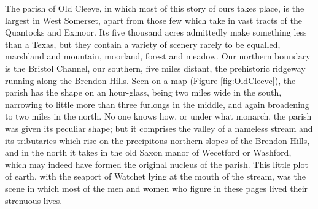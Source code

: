 
The parish of Old Cleeve, in which most of this story of ours takes place, is the largest in West Somerset, apart from those few which take in vast tracts of the Quantocks and Exmoor. Its five thousand acres admittedly make something less than a Texas, but they contain a variety of scenery rarely to be equalled, marshland and mountain, moorland, forest and meadow. Our northern boundary is the Bristol Channel, our southern, five miles distant, the prehistoric ridgeway running along the Brendon Hills. Seen on a map (Figure \ref{fig:OldCleeve}), the parish has the shape on an hour-glass, being two miles wide in the south, narrowing to little more than three furlongs in the middle, and again broadening to two miles in the north. No one knows how, or under what monarch, the parish was given its peculiar shape; but it comprises the valley of a nameless stream and its tributaries which rise on the precipitous northern slopes of the Brendon Hills, and in the north it takes in the old Saxon manor of Wecetford or Washford, which may indeed have formed the original nucleus of the parish. This little plot of earth, with the seaport of Watchet lying at the mouth of the stream, was the scene in which most of the men and women who figure in these pages lived their strenuous lives.

